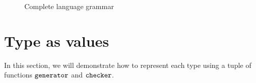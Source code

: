 \begin{figure}[hbt!]%
  \begin{grammar}
            \grule[types]{\syntype}{
                \tint
                \gor \tbool
                \gor \tfun
                \gor \tpoly
                \gor \mkunion{\syntype}{\syntype}
                \gor \mkintersect{\syntype}{\syntype}
                \gor \mktset{\syntype}{\expr}
                \gor \mkdfun{\ev}{\syntype}{\syntype}
                \gor \mkmiu{\alpha}{\syntype}
                \gor \{\overline{\hastype{\elbl}{\syntype}}\}
          }
        \end{grammar}
    \caption{Complete language grammar}
    \label{fig_completeGrammar}
\end{figure}

\section{Type as values}

In this section, we will demonstrate how to represent each type using a tuple of functions $\texttt{generator}$ and $\texttt{checker}$.

